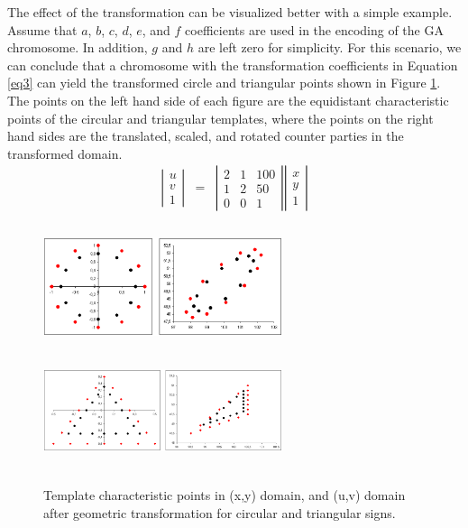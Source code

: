 \documentclass[twocolumn,letterpaper,10pt]{article}
\begin{document}
The effect of the transformation can be visualized better with a simple example. Assume that $a$, $b$, $c$, $d$, $e$, and $f$ coefficients are used in the encoding of the GA chromosome. In addition, $g$ and $h$ are left zero for simplicity. For this scenario, we can conclude that a chromosome with the transformation coefficients in Equation \ref{eq3} can yield the transformed circle and triangular points shown in Figure \ref{fig:sdfig2}. The points on the left hand side of each figure are the equidistant characteristic points of the circular and triangular templates, where the points on the right hand sides are the translated, scaled, and rotated counter parties in the transformed domain. 
\begin{eqnarray}
\label{eq3}
\left| \begin{array}{ccc} u \\ v \\ 1 \end{array} \right| &=& 
\left| \begin{array}{ccc} 2 & 1 & 100 \\ 1 & 2 & 50 \\ 0 & 0 & 1 \end{array} \right| \left| \begin{array}{ccc} x \\ y \\ 1 \end{array} \right|
\end{eqnarray}
\begin{figure}[ht]
\begin{center}
\includegraphics[width=70mm,height=35mm]{img/sdfig7.eps}
\includegraphics[width=70mm,height=35mm]{img/sdtri1.eps}
\caption{Template characteristic points in (x,y) domain,  and (u,v) domain after geometric transformation for circular and triangular signs.}
\label{fig:sdfig2}
\end{center}
\end{figure}
\end{document}
